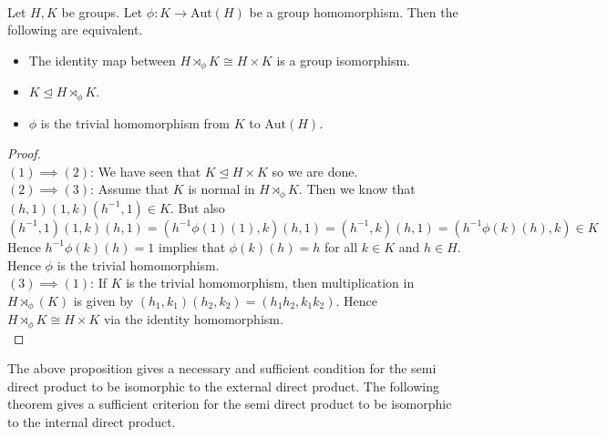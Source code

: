 \documentclass[a4paper]{article}
\begin{document}
\begin{prp}{}{}\\
Let $H,K$ be groups. Let $\phi:K\to\text{Aut}(H)$ be a group homomorphism. Then the following are equivalent. 
\begin{itemize}
\item The identity map between $H\rtimes_\phi K\cong H\times K$ is a group isomorphism. 
\item $K\trianglelefteq H\rtimes_\phi K$. 
\item $\phi$ is the trivial homomorphism from $K$ to $\text{Aut}(H)$. 
\end{itemize}
\begin{proof}\\
$(1)\implies(2)$: We have seen that $K\trianglelefteq H\times K$ so we are done. \\

$(2)\implies(3)$: Assume that $K$ is normal in $H\rtimes_\phi K$. Then we know that $(h,1)(1,k)(h^{-1},1)\in K$. But also $$(h^{-1},1)(1,k)(h,1)=(h^{-1}\phi(1)(1),k)(h,1)=(h^{-1},k)(h,1)=(h^{-1}\phi(k)(h),k)\in K$$ Hence $h^{-1}\phi(k)(h)=1$ implies that $\phi(k)(h)=h$ for all $k\in K$ and $h\in H$. Hence $\phi$ is the trivial homomorphism. \\

$(3)\implies(1)$: If $K$ is the trivial homomorphism, then multiplication in $H\rtimes_\phi(K)$ is given by $(h_1,k_1)(h_2,k_2)=(h_1h_2,k_1k_2)$. Hence $H\rtimes_\phi K\cong H\times K$ via the identity homomorphism. \\

\end{proof}
\end{prp}

The above proposition gives a necessary and sufficient condition for the semi direct product to be isomorphic to the external direct product. The following theorem gives a sufficient criterion for the semi direct product to be isomorphic to the internal direct product. 
\end{document}
